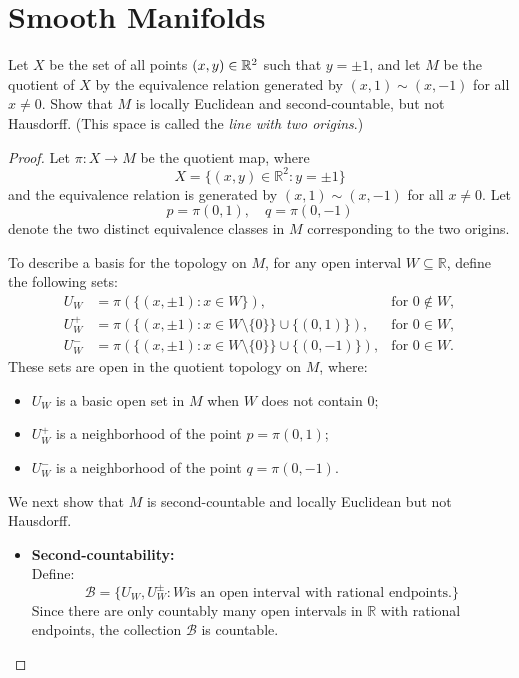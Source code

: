 \chapter{Smooth Manifolds}
\begin{problem}
  Let $ X $ be the set of all points $ (x, y) \in \mathbb{R}^2 $ such that $ y = \pm 1 $, and let $ M $ be the quotient of $ X $ by the equivalence relation generated by $ (x, 1) \sim (x, -1) $ for all $ x \neq 0 $. Show that $ M $ is locally Euclidean and second-countable, but not Hausdorff. (This space is called the \emph{line with two origins}.)
  \begin{proof}
    Let $\pi \colon X \rightarrow M$ be the quotient map, where
    \begin{equation*}
      X = \{(x,y) \in \mathbb{R}^2 : y = \pm 1\}
    \end{equation*}
    and the equivalence relation is generated by $(x,1) \sim (x,-1)$ for all $x \ne 0$.
    Let
    \begin{equation*}
      p = \pi(0,1), \quad q = \pi(0,-1)
    \end{equation*}
    denote the two distinct equivalence classes in $M$ corresponding to the two origins.

    To describe a basis for the topology on \(M\), for any open interval \(W \subseteq \mathbb{R}\), define the following sets:
    \begin{equation*}
      \begin{aligned}
        U_W &= \pi\left( \{(x, \pm 1) : x \in W \} \right), &\text{for } 0 \notin W, \\
        U_W^+ &= \pi\left( \{(x, \pm 1) : x \in W \setminus \{0\} \} \cup \{(0,1)\} \right), & \text{for } 0 \in W, \\
        U_W^- &= \pi\left( \{(x, \pm 1) : x \in W \setminus \{0\} \} \cup \{(0,-1)\} \right), & \text{for } 0 \in W.
      \end{aligned}
    \end{equation*}
    These sets are open in the quotient topology on \(M\), where:
    \begin{itemize}
      \item \(U_W\) is a basic open set in \(M\) when \(W\) does not contain 0;
      \item \(U_W^+\) is a neighborhood of the point \(p = \pi(0,1)\);
      \item \(U_W^-\) is a neighborhood of the point \(q = \pi(0,-1)\).
    \end{itemize}
    We next show that $M$ is second-countable and locally Euclidean but not Hausdorff.
    \begin{itemize}
      \item \textbf{Second-countability:} \\
      Define:
      \begin{equation*}
        \mathcal{B} = \{U_W, U_W^{\pm} \colon W \text{is an open interval with rational endpoints.}\}
      \end{equation*}
      Since there are only countably many open intervals in $\mathbb{R}$ with rational endpoints, the collection $\mathcal{B}$ is countable.


\end{itemize}
\end{proof}
\end{problem}
